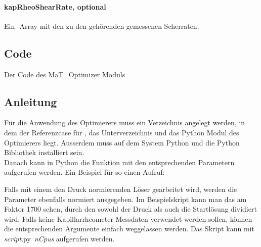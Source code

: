 \paragraph{kapRheoShearRate, optional}
Ein -Array mit den zu den  gehörenden gemessenen Scherraten.
\subsection{Code}
\label{Appendix:Python:Code}
Der Code des MaT\_Optimizer Moduls

%
\subsection{Anleitung}
\label{Appendix:Python:Anleitung}
Für die Anwendung des Optimierers muss ein Verzeichnis angelegt werden, in dem der Referenzcase für \openfoam{}, das Unterverzeichnis  und das Python Modul des Optimierers liegt.
Ausserdem muss auf dem System Python und die Python Bibliothek  installiert sein.\\
Danach kann in Python die Funktion  mit den entsprechenden Parametern aufgerufen werden.
Ein Beispiel für so einen Aufruf:

Falls mit einem den Druck normierenden Löser gearbeitet wird, werden die Parameter ebenfalls normiert ausgegeben. Im Beispielskript kann man das am Faktor 1700 sehen, durch den sowohl der Druck als auch die Startlösung dividiert wird.
Falls keine Kapillarrheometer Messdaten verwendet werden sollen, können die entsprechenden Argumente einfach weggelassen werden.
Das Skript kann mit \emph{script}.py~\emph{nCpus} aufgerufen werden.
